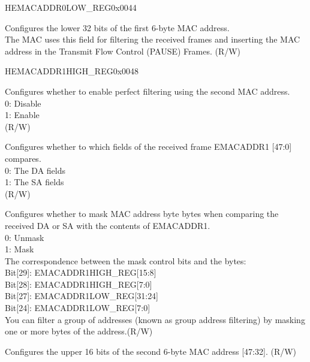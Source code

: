 \begin{register}{H}{EMACADDR0LOW\_REG}{0x0044}\label{regdesc:EMACADDR0LOWREG}
%
\regnewline%
\begin{regdesc}\begin{reglist}
\item [EMACADDR0LOW\_REG] Configures the lower 32 bits of the first 6-byte MAC address.\\ The MAC uses this field for filtering the received frames and inserting the MAC address in the Transmit Flow Control (PAUSE) Frames. (R/W)
\end{reglist}\end{regdesc}
\end{register}


\begin{register}{H}{EMACADDR1HIGH\_REG}{0x0048}\label{regdesc:EMACADDR1HIGHREG}
%
%
%
%
%
\regnewline%
\begin{regdesc}\begin{reglist}
\item [ADDRESS\_ENABLE1] Configures whether to enable perfect filtering using the second MAC address.\\
0: Disable\\
1: Enable\\ (R/W)
\item [SOURCE\_ADDRESS] Configures whether to which fields of the received frame EMACADDR1 [47:0] compares.\\
0: The DA fields\\
1: The SA fields\\ (R/W)
\item [MASK\_BYTE\_CONTROL] Configures whether to mask MAC address byte bytes when comparing the received DA or SA with the contents of EMACADDR1.\\
0: Unmask\\
1: Mask\\
The correspondence between the mask control bits and the bytes:\\
Bit[29]: EMACADDR1HIGH\_REG[15:8]\\
Bit[28]: EMACADDR1HIGH\_REG[7:0]\\
Bit[27]: EMACADDR1LOW\_REG[31:24]\\
Bit[24]: EMACADDR1LOW\_REG[7:0]\\
You can filter a group of addresses (known as group address filtering) by masking one or more bytes of the address.(R/W)
\item [MAC\_ADDRESS1\_HI] Configures the upper 16 bits of the second 6-byte MAC address [47:32]. (R/W)
\end{reglist}\end{regdesc}
\end{register}


